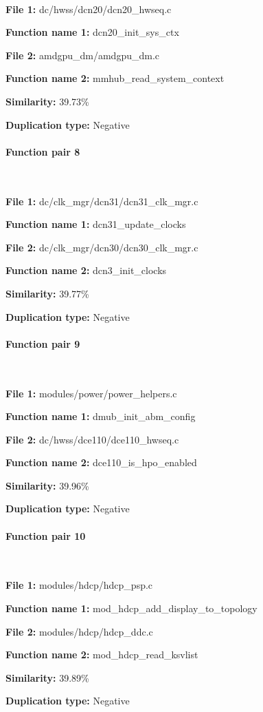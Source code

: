 \

\textbf{File 1:} dc/hwss/dcn20/dcn20\_hwseq.c

\textbf{Function name 1:} dcn20\_init\_sys\_ctx

\textbf{File 2:} amdgpu\_dm/amdgpu\_dm.c

\textbf{Function name 2:} mmhub\_read\_system\_context

\textbf{Similarity:} 39.73\%

\textbf{Duplication type:} Negative


\paragraph{Function pair 8 }  

\

\textbf{File 1:} dc/clk\_mgr/dcn31/dcn31\_clk\_mgr.c

\textbf{Function name 1:} dcn31\_update\_clocks

\textbf{File 2:} dc/clk\_mgr/dcn30/dcn30\_clk\_mgr.c

\textbf{Function name 2:} dcn3\_init\_clocks

\textbf{Similarity:} 39.77\%

\textbf{Duplication type:} Negative


\paragraph{Function pair 9 }  

\

\textbf{File 1:} modules/power/power\_helpers.c

\textbf{Function name 1:} dmub\_init\_abm\_config

\textbf{File 2:} dc/hwss/dce110/dce110\_hwseq.c

\textbf{Function name 2:} dce110\_is\_hpo\_enabled

\textbf{Similarity:} 39.96\%

\textbf{Duplication type:} Negative


\paragraph{Function pair 10 }  

\

\textbf{File 1:} modules/hdcp/hdcp\_psp.c

\textbf{Function name 1:} mod\_hdcp\_add\_display\_to\_topology

\textbf{File 2:} modules/hdcp/hdcp\_ddc.c

\textbf{Function name 2:} mod\_hdcp\_read\_ksvlist

\textbf{Similarity:} 39.89\%

\textbf{Duplication type:} Negative



